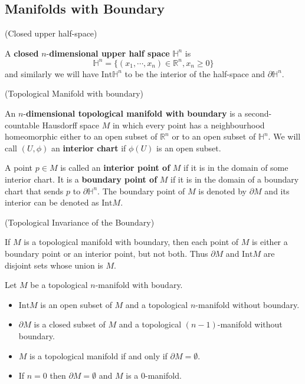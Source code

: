 \subsection{Manifolds with Boundary}
\begin{definition}(Closed upper half-space)\par
    A \textbf{closed} $n$-\textbf{dimensional upper half space} $\mathbb{H}^n$ is
    \[\mathbb{H}^n = \{(x_1,\cdots,x_n) \in \mathbb{R}^n, x_n \geq 0\}\]
    and similarly we will have $\text{Int}\mathbb{H}^n$ to be the interior of the half-space and $\partial\mathbb{H}^n$.
\end{definition}

\begin{definition}(Topological Manifold with boundary)\par
    An $n$-\textbf{dimensional topological manifold with boundary} is a second-countable Hausdorff space $M$ in which every point has a neighbourhood homeomorphic either to an open subset of $\mathbb{R}^n$ or to an open subset of $\mathbb{H}^n$. We will call $(U,\phi)$ an \textbf{interior chart} if $\phi(U)$ is an open subset.\par
    A point $p\in M$ is called an \textbf{interior point of }$M$ if it is in the domain of some interior chart. It is a \textbf{boundary point of }$M$ if it is in the domain of a boundary chart that sends $p$ to $\partial \mathbb{H}^n$. The boundary point of $M$ is denoted by $\partial M$ and its interior can be denoted as $\text{Int}M$. 
\end{definition}

\begin{theorem}(Topological Invariance of the Boundary)\par
If $M$ is a topological manifold with boundary, then each point of $M$ is either a boundary point or an interior point, but not both. Thus $\partial M$ and $\text{Int}M$ are disjoint sets whose union is $M$.
\end{theorem}

\begin{proposition}
    Let $M$ be a topological $n$-manifold with boudary.\par
    \begin{itemize}
        \item $\text{Int}M$ is an open subset of $M$ and a topological $n$-manifold without boundary.
        \item $\partial M$ is a closed subset of $M$ and a topological $(n-1)$-manifold without boundary.
        \item $M$ is a topological manifold if and only if $\partial M = \emptyset$.
        \item If $n=0$ then $\partial M = \emptyset$ and $M$ is a $0$-manifold.
    \end{itemize}
\end{proposition}
